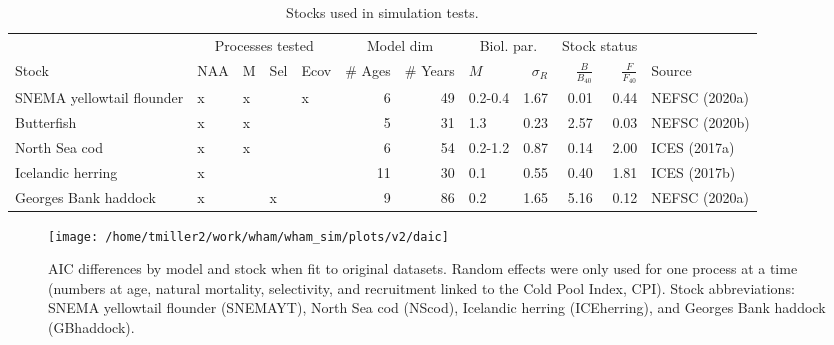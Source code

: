 \documentclass[]{article}
\begin{document}
\begin{landscape}
\begin{table}

\caption{\label{tab:stock-list}Stocks used in simulation tests.}
\centering
\begin{tabular}[t]{lllllrrlrrrl}
\toprule
\multicolumn{1}{c}{ } & \multicolumn{4}{c}{Processes tested} & \multicolumn{2}{c}{Model dim} & \multicolumn{2}{c}{Biol. par.} & \multicolumn{2}{c}{Stock status} \\
\cmidrule(l{3pt}r{3pt}){2-5} \cmidrule(l{3pt}r{3pt}){6-7} \cmidrule(l{3pt}r{3pt}){8-9} \cmidrule(l{3pt}r{3pt}){10-11}
Stock & NAA & M & Sel & Ecov & \# Ages & \# Years & $M$ & $\sigma_R$ & $\frac{B}{B_{40}}$ & $\frac{F}{F_{40}}$ & Source\\
\midrule
SNEMA yellowtail flounder & x & x &  & x & 6 & 49 & 0.2-0.4 & 1.67 & 0.01 & 0.44 & NEFSC (2020a)\\
Butterfish & x & x &  &  & 5 & 31 & 1.3 & 0.23 & 2.57 & 0.03 & NEFSC (2020b)\\
North Sea cod & x & x &  &  & 6 & 54 & 0.2-1.2 & 0.87 & 0.14 & 2.00 & ICES (2017a)\\
Icelandic herring & x &  &  &  & 11 & 30 & 0.1 & 0.55 & 0.40 & 1.81 & ICES (2017b)\\
Georges Bank haddock & x &  & x &  & 9 & 86 & 0.2 & 1.65 & 5.16 & 0.12 & NEFSC (2020a)\\
\bottomrule
\end{tabular}
\end{table}
\end{landscape}

\pagebreak

\begin{landscape}
\begin{figure}

{\centering \texttt{[image: /home/tmiller2/work/wham/wham\_sim/plots/v2/daic]} 

}

\caption{AIC differences by model and stock when fit to original datasets. Random effects were only used for one process at a time (numbers at age, natural mortality, selectivity, and recruitment linked to the Cold Pool Index, CPI). Stock abbreviations: SNEMA yellowtail flounder (SNEMAYT), North Sea cod (NScod), Icelandic herring (ICEherring), and Georges Bank haddock (GBhaddock).}\label{fig:daic}
\end{figure}
\end{landscape}

\pagebreak
\end{document}
